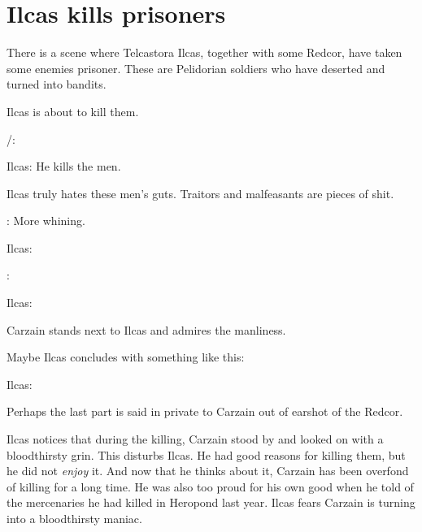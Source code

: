 \section{Ilcas kills prisoners}
There is a scene where Telcastora Ilcas, together with some Redcor, have taken some enemies prisoner. 
These are Pelidorian soldiers who have deserted and turned into bandits. 

Ilcas is about to kill them. 

\begin{prose}
  \Racel/\Esmerel: 
  
  Ilcas: 
  He kills the men. 
\end{prose}

Ilcas truly hates these men's guts. 
Traitors and malfeasants are pieces of shit. 

\begin{prose}
  \Esmerel: More whining. 
  
  Ilcas: 
  
  \Esmerel: 
  
  Ilcas: 
\end{prose}

Carzain stands next to Ilcas and admires the manliness. 

Maybe Ilcas concludes with something like this: 

\begin{prose}
  Ilcas: 
\end{prose}

Perhaps the last part is said in private to Carzain out of earshot of the Redcor. 

Ilcas notices that during the killing, Carzain stood by and looked on with a bloodthirsty grin. 
This disturbs Ilcas. 
He had good reasons for killing them, but he did not \emph{enjoy} it. 
And now that he thinks about it, Carzain has been overfond of killing for a long time. 
He was also too proud for his own good when he told of the mercenaries he had killed in Heropond last year. 
Ilcas fears Carzain is turning into a bloodthirsty maniac. 





